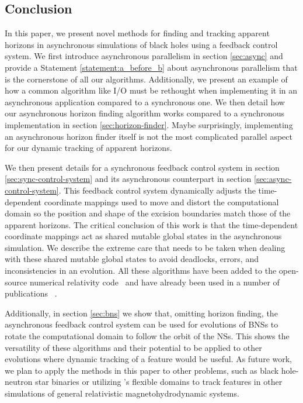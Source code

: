 \begin{bibunit}[unsrtnat]
\section{Conclusion\label{sec:3_conclusion}}

In this paper, we present novel methods for finding and tracking apparent
horizons in asynchronous simulations of black holes using a feedback control
system. We first introduce asynchronous parallelism in section \ref{sec:async}
and provide a Statement \ref{statement:a_before_b} about asynchronous
parallelism that is the cornerstone of all our algorithms. Additionally, we
present an example of how a common algorithm like I/O must be rethought when
implementing it in an asynchronous application compared to a synchronous one. We
then detail how our asynchronous horizon finding algorithm works compared to a
synchronous implementation in section \ref{sec:horizon-finder}. Maybe
surprisingly, implementing an asynchronous horizon finder itself is not the most
complicated parallel aspect for our dynamic tracking of apparent horizons.

We then present details for a synchronous feedback control system in section
\ref{sec:sync-control-system} and its asynchronous counterpart in section
\ref{sec:async-control-system}. This feedback control system dynamically adjusts
the time-dependent coordinate mappings used to move and distort the
computational domain so the position and shape of the excision boundaries match
those of the apparent horizons. The critical conclusion of this work is that the
time-dependent coordinate mappings act as shared mutable global states in the
asynchronous simulation. We describe the extreme care that needs to be taken
when dealing with these shared mutable global states to avoid deadlocks, errors,
and inconsistencies in an evolution. All these algorithms have been added to the
open-source numerical relativity code \spectre~and have already been used in a
number of publications
~\cite{Deppe:2024ckt, Lovelace:2024wra, Lara:2024rwa, Wittek:2024pis,
  Lara:2025kzj, Habib:2025inprep}.

Additionally, in section \ref{sec:bns} we show that, omitting horizon finding,
the asynchronous feedback control system can be used for evolutions of BNSs to
rotate the computational domain to follow the orbit of the NSs. This shows the
versatility of these algorithms and their potential to be applied to other
evolutions where dynamic tracking of a feature would be useful. As future work,
we plan to apply the methods in this paper to other problems, such as black
hole-neutron star binaries or utilizing \spectre's flexible domains to track
features in other simulations of general relativistic magnetohydrodynamic
systems.


\end{bibunit}
